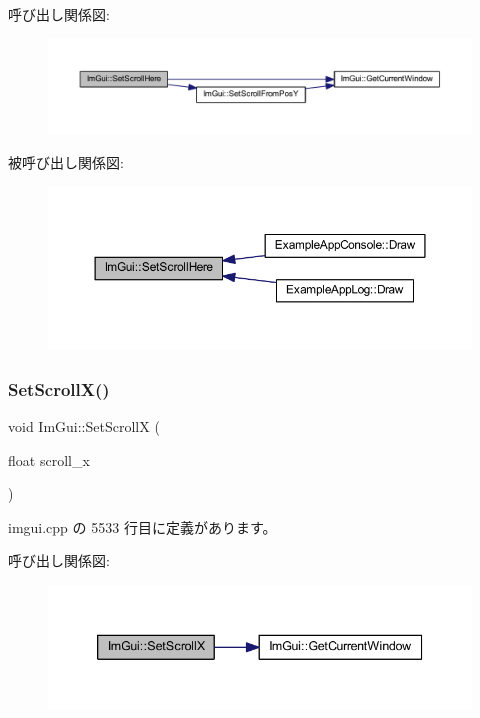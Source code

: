 呼び出し関係図\+:\nopagebreak
\begin{figure}[H]
\begin{center}
\leavevmode
\includegraphics[width=350pt]{namespace_im_gui_aa60ea4a42b8d03d27431f8e79b9f0254_cgraph}
\end{center}
\end{figure}
被呼び出し関係図\+:\nopagebreak
\begin{figure}[H]
\begin{center}
\leavevmode
\includegraphics[width=350pt]{namespace_im_gui_aa60ea4a42b8d03d27431f8e79b9f0254_icgraph}
\end{center}
\end{figure}
\mbox{\label{namespace_im_gui_a0796750de8c50555d895f63e79ac87f0}} 
\subsubsection{\texorpdfstring{Set\+Scroll\+X()}{SetScrollX()}}
{\footnotesize\ttfamily void Im\+Gui\+::\+Set\+ScrollX (\begin{DoxyParamCaption}\item[{float}]{scroll\+\_\+x }\end{DoxyParamCaption})}



 imgui.\+cpp の 5533 行目に定義があります。

呼び出し関係図\+:\nopagebreak
\begin{figure}[H]
\begin{center}
\leavevmode
\includegraphics[width=339pt]{namespace_im_gui_a0796750de8c50555d895f63e79ac87f0_cgraph}
\end{center}
\end{figure}
\mbox{\label{namespace_im_gui_a41833555962807384432e6fc94d46ec9}} 
